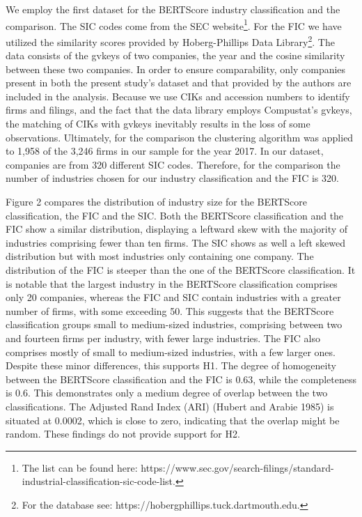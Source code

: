 \documentclass[
]{article}
\begin{document}
We employ the first dataset for the BERTScore industry classification
and the comparison. The SIC codes come from the SEC website\footnote{The
  list can be found here:
  https://www.sec.gov/search-filings/standard-industrial-classification-sic-code-list.}.
For the FIC we have utilized the similarity scores provided by
Hoberg-Phillips Data Library\footnote{For the database see:
  https://hobergphillips.tuck.dartmouth.edu.}. The data consists of the
gvkeys of two companies, the year and the cosine similarity between
these two companies. In order to ensure comparability, only companies
present in both the present study's dataset and that provided by the
authors are included in the analysis. Because we use CIKs and accession
numbers to identify firms and filings, and the fact that the data
library employs Compustat's gvkeys, the matching of CIKs with gvkeys
inevitably results in the loss of some observations. Ultimately, for the
comparison the clustering algorithm was applied to 1,958 of the 3,246
firms in our sample for the year 2017. In our dataset, companies are
from 320 different SIC codes. Therefore, for the comparison the number
of industries chosen for our industry classification and the FIC is 320.

Figure 2 compares the distribution of industry size for the BERTScore
classification, the FIC and the SIC. Both the BERTScore classification
and the FIC show a similar distribution, displaying a leftward skew with
the majority of industries comprising fewer than ten firms. The SIC
shows as well a left skewed distribution but with most industries only
containing one company. The distribution of the FIC is steeper than the
one of the BERTScore classification. It is notable that the largest
industry in the BERTScore classification comprises only 20 companies,
whereas the FIC and SIC contain industries with a greater number of
firms, with some exceeding 50. This suggests that the BERTScore
classification groups small to medium-sized industries, comprising
between two and fourteen firms per industry, with fewer large
industries. The FIC also comprises mostly of small to medium-sized
industries, with a few larger ones. Despite these minor differences,
this supports H1. The degree of homogeneity between the BERTScore
classification and the FIC is 0.63, while the completeness is 0.6. This
demonstrates only a medium degree of overlap between the two
classifications. The Adjusted Rand Index (ARI) (Hubert and Arabie 1985)
is situated at 0.0002, which is close to zero, indicating that the
overlap might be random. These findings do not provide support for H2.
\end{document}
